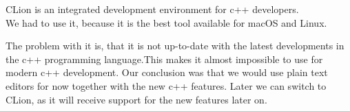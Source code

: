CLion is an integrated development environment for c++ developers. \cite{clion} \\
We had to use it, because it is the best tool available for macOS and Linux.

The problem with it is, that it is not up-to-date with the latest developments in the c++ programming language.This makes it almost impossible to use for modern c++ development. Our conclusion was that we would use plain text editors for now together with the new c++ features. Later we can switch to CLion, as it will receive support for the new features later on. \cite{clionstatus}
